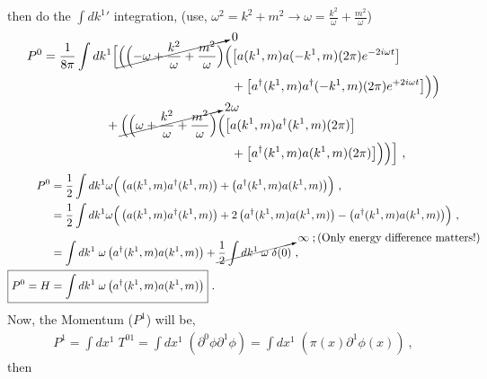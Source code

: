 \documentclass[12pt,a4paper]{report}
\begin{document}
	then do the $\int dk^1'$ integration, (use, $\omega^2=k^2+m^2\longrightarrow\omega=\frac{k^2}{\omega}+\frac{m^2}{\omega}$)
		\begin{align}
		P^0&= \frac{1}{8\pi}\int dk^1 \Bigl[ \cancelto{0}{\Bigl( \Bigl( -\omega+\frac{k^2}{\omega}+\frac{m^2}{\omega}\Bigr)}\Bigl( {\left [ a(k^1,m)a(-k^1,m)(2\pi)e^{-2i\omega t}\right]} \nonumber\\ 
		&~~~~~~~~~~~~~~~~~~~~~~~~~~~~~~~~~~~~~~~~~~~~~+{\left [a^{\dagger}(k^1,m)a^{\dagger}(-k^1,m)(2\pi)e^{+2i\omega t}\right]} \Bigr)\Bigr) \nonumber\\ 
		&~~~~~~~~~~~~~~~ + \cancelto{2\omega}{\Bigl( \Bigl( \omega+\frac{k^2}{\omega}+\frac{m^2}{\omega}\Bigr)}\Bigl({\left [ a(k^1,m)a^{\dagger}(k^1,m)(2\pi)\right]} \nonumber\\ 
		&~~~~~~~~~~~~~~~~~~~~~~~~~~~~~~~~~~~~~~~~~~~~~+{\left [a^{\dagger}(k^1,m)a(k^1,m)(2\pi)\right]} \Bigr)\Bigr)\Bigr]\nonumber~,
 		\end{align}
		\begin{align}
		P^0&= \frac{1}{2}\int dk^1 \omega\Bigr(\left ( a(k^1,m)a^{\dagger}(k^1,m)\right) +\left (a^{\dagger}(k^1,m)a(k^1,m)\right) \Bigr) \nonumber~, \\
	&=\frac{1}{2}\int dk^1 \omega\Bigr(\left ( a(k^1,m)a^{\dagger}(k^1,m)\right)+2\left (a^{\dagger}(k^1,m)a(k^1,m)\right)-\left (a^{\dagger}(k^1,m)a(k^1,m)\right)\Bigr) \nonumber~, \\
	&=\int dk^1 \;\omega\left (a^{\dagger}(k^1,m)a(k^1,m)\right)+\cancelto{\infty\;;(\text{Only energy difference matters!})}{\frac{1}{2}\int dk^1\;\omega \;\delta(0)}~, \nonumber\\
	\Aboxed{P^0=H&=\int dk^1 \;\omega\left (a^{\dagger}(k^1,m)a(k^1,m)\right)}~.
	\end{align}
Now, the Momentum ($P^1$) will be,
    \begin{align}
	    P^1= \int dx^1\; T^{01}=\int dx^1\; \left(\partial^0\phi\partial^1\phi \right)=\int dx^1\; \left(\pi(x)\partial^1\phi(x) \right)~,
	\end{align}
then
\end{document}
